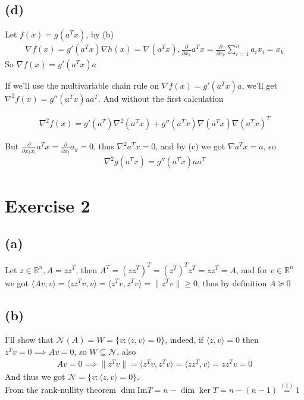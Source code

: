 \documentclass{article}
\begin{document}
\subsection*{(d)}
Let $f(x)=g(a^Tx)$, by (b)
\begin{align*}
  \nabla f(x)=g'(a^Tx)
  \nabla h(x) = \nabla (a^Tx), \frac{\partial}{\partial x_{k}}a^Tx=\frac{\partial}{\partial x_{k}}\sum_{i=1}^{n}a_{i}x_{i}=x_{k}
\end{align*}
So $\nabla f(x) = g'(a^Tx)a$

If we'll use the multivariable chain rule on $\nabla f(x)=g'(a^Tx)a$, we'll get $\nabla ^2f(x)=g''(a^Tx)aa^T$.
And without the first calculation

\begin{align*}
  \nabla ^2 f(x) = g'(a^T)\nabla^2 (a^Tx)+g''(a^Tx)\nabla (a^Tx) \nabla (a^Tx)^T
\end{align*}

But $\frac{\partial}{\partial x_{k}x_{t}} a^Tx =
  \frac{\partial}{\partial x_{t}} a_{k}=0$, thus $\nabla ^2 a^Tx=0$, and by (c) we got $\nabla a^Tx=a$, so
\begin{align*}
  \nabla ^2 g(a^Tx)=g''(a^Tx)aa^T
\end{align*}

\newpage

\section*{Exercise 2}

\subsection*{(a)}

Let $z \in \mathbb{R}^n, A=zz^T$, then $A^T=(zz^T)^T=(z^T)^Tz^T=zz^T=A$, and for $v \in \mathbb{R}^n$ we got $\langle Av,v \rangle=\langle zz^Tv,v\rangle=\langle z^Tv,z^Tv \rangle=\|z^Tv\| \ge 0$, thus by definition $A \succeq 0$

\subsection*{(b)}
I'll show that $\mathcal{N}(A)=W=\{ v:\langle z,v \rangle =0\}$, indeed, if $\langle z,v \rangle =0$ then $z^Tv=0 \implies Av=0$, so $W \subseteq \mathcal{N}$, also
\begin{align*}
  Av=0 \implies \| z^Tv \| = \langle z^Tv, z^Tv\rangle =\langle zz^T,v \rangle =zz^Tv=0
\end{align*}
And thus we got $\mathcal{N}=\{ v:\langle z,v \rangle =0\}$.
\\From the rank-nullity theorem $\dim\text{Im}T=n-\dim \ker T=n-(n-1)\overset{(1)}{=}1$
\end{document}
